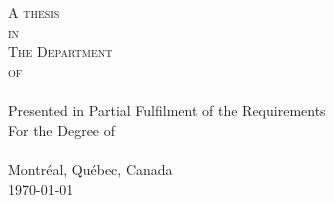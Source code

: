 \documentclass[11pt, a4paper, oneside]{Thesis} %
\title{\ttitle} %
\begin{document}
\frontmatter %


\fancyhead{} %
\rhead{\thepage} %
\lhead{} %

\pagestyle{fancy} %

\newcommand{\HRule}{\rule{\linewidth}{0.5mm}} %

\hypersetup{pdfsubject=\subjectname}
\hypersetup{pdfauthor=\authornames}
\hypersetup{pdfkeywords=\keywordnames}


\begin{titlepage}
\begin{center}

\vspace*{6ex}
{\huge \bfseries \ttitle}\\[4cm] %
 
\textsc {\Large \href{http://ca.linkedin.com/pub/lin-cheng/19/191/422} \authornames}\\[3cm] %

\large \textsc{A thesis\\ in\\ The Department\\ of\\ \deptname }\\[3cm] %
{Presented in Partial Fulfilment of the Requirements\\ For the Degree of \degreename \\ \univname\\ Montr\'{e}al, Qu\'{e}bec, Canada}\\[1cm]
 
{\large \today} %
 
\vfill
\end{center}

\end{titlepage}
\end{document}
